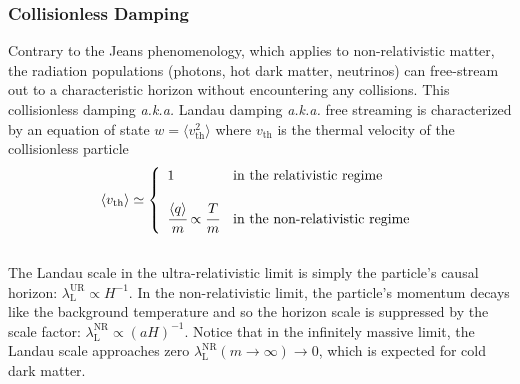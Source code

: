 \subsubsection*{Collisionless Damping}


Contrary to the Jeans phenomenology, which applies to non-relativistic matter, the radiation populations (photons, hot dark matter, neutrinos) can free-stream out to a characteristic horizon without encountering any collisions. This collisionless damping \textit{a.k.a.} Landau damping \textit{a.k.a.} free streaming is characterized by an equation of state $w = \langle v^2_{\mathrm{th}} \rangle$ where $v_{\mathrm{th}}$ is the thermal velocity of the collisionless particle\\
\begin{equation}
\label{eq:thermal_velocity_mass}
\langle v_{\mathrm{th}} \rangle \simeq \left\{
\begin{array}{ll}
1 & \text{in the relativistic regime}\\
\\
\cfrac{\langle q \rangle}{m} \propto \cfrac{T}{m}& \text{in the non-relativistic regime}
\end{array}
\right.
\end{equation}\\

The Landau scale in the ultra-relativistic limit is simply the particle's causal horizon: $\lambda^{\mathrm{UR}}_{\mathrm{L}} \propto H^{-1}$. In the non-relativistic limit, the particle's  momentum decays like the background temperature and so the horizon scale is suppressed by the scale factor: $\lambda^{\mathrm{NR}}_{\mathrm{L}} \propto (aH)^{-1}$. Notice that in the infinitely massive limit, the Landau scale approaches zero $\lambda^{\mathrm{NR}}_{\mathrm{L}} (m \rightarrow \infty) \rightarrow 0$, which is expected for cold dark matter. \\

